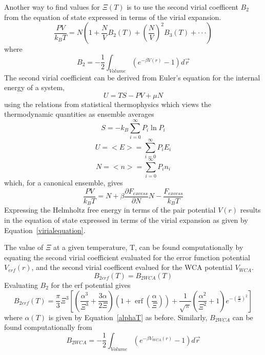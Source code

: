 \documentclass[12pt]{article}
\begin{document}
Another way to find values for $\Xi(T)$ is to use the second virial coefficent $B_{2}$ from the equation of state expressed in terms of the virial expansion. 
\begin{equation}\label{virialequation}
    \frac{PV}{k_BT}=N\left(1+\frac{N}{V}B_2(T)+\left(\frac{N}{V}\right)^2B_3(T)+ \cdot\cdot\cdot\right) 
\end{equation}
where 
\begin{equation}
	B_{2}=-\frac{1}{2}\int_{Volume}\left(e^{-\beta{V}(r)}-1\right)d\vec{r} 
\end{equation}
The second virial coefficient can be derived from Euler's equation for the internal energy of a system, 
\begin{equation}U=TS-PV+\mu{N}\end{equation}
using the relations from statistical thermophysics which views the thermodynamic quantities as ensemble averages
\begin{equation}S=-k_B\sum_{i=0}^\infty{P_i\ln{P_i}}\end{equation}
\begin{equation}U=<E>=\sum_{i=0}^\infty{P_iE_i}\end{equation}
\begin{equation}N=<n>=\sum_{i=0}^\infty{P_in_i}\end{equation}
which, for a canonical ensemble, gives
\begin{equation}\frac{PV}{k_BT}=N + \beta\frac{\partial{F}_{excess}}{\partial{N}}{N} - \frac{F_{excess}}{k_BT}\end{equation}
Expressing the Helmholtz free energy in terms of the pair potential $V(r)$ results in the equation of state expressed in terms of the virial expansion as given by Equation~\ref{virialequation}.

The value of $\Xi$ at a given temperature, T, can be found computationally by equating the second virial coefficient evaluated for the error function potential $V_{erf}(r)$, and the second virial coefficent evalued for the WCA potential $V_{WCA}$.
\begin{equation}B_{2erf}(T) =B_{2WCA}(T)\end{equation}
Evaluating $B_{2}$ for the erf potential gives
\begin{equation}
	B_{2erf}(T) = \frac{\pi}{3}\Xi^3\left[\left(\frac{\alpha^3}{\Xi^3}+\frac{3\alpha}{2\Xi}\right)\left(1+\operatorname{erf}\left(\frac{\alpha}{\Xi}\right)\right)+\frac{1}{\sqrt{\pi}}\left(\frac{\alpha^2}{\Xi^2}+1\right)e^{-\left(\frac{\alpha}{\Xi}\right)^2}\right]
\end{equation}
where $\alpha(T)$ is given by Equation~\ref{alphaT} as before. Similarly, $B_{2WCA}$ can be found computationally from 
\begin{equation}
	B_{2WCA}=-\frac{1}{2}\int_{Volume}\left(e^{-\beta{V}_{WCA}(r)}-1\right)d\vec{r} 
\end{equation}
 
\end{document}
